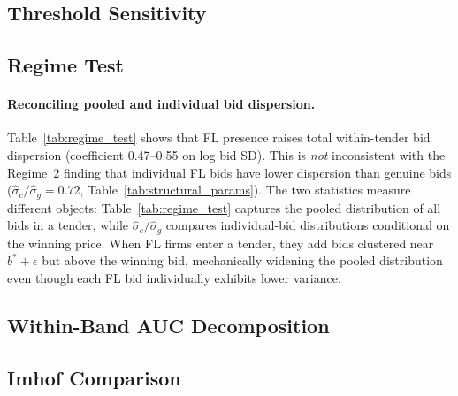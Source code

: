 

\subsection{Threshold Sensitivity}

\begin{table}[htbp]
\centering
\caption{Price Coefficient Across IQR Multiplier Thresholds}
\label{tab:threshold}

\end{table}

\subsection{Regime Test}



\paragraph{Reconciling pooled and individual bid dispersion.}
Table~\ref{tab:regime_test} shows that FL presence raises total within-tender bid dispersion (coefficient 0.47--0.55 on log bid SD). This is \emph{not} inconsistent with the Regime~2 finding that individual FL bids have lower dispersion than genuine bids ($\hat{\sigma}_c / \hat{\sigma}_g = 0.72$, Table~\ref{tab:structural_params}). The two statistics measure different objects: Table~\ref{tab:regime_test} captures the pooled distribution of all bids in a tender, while $\hat{\sigma}_c / \hat{\sigma}_g$ compares individual-bid distributions conditional on the winning price. When FL firms enter a tender, they add bids clustered near $b^* + \epsilon$ but above the winning bid, mechanically widening the pooled distribution even though each FL bid individually exhibits lower variance.

\subsection{Within-Band AUC Decomposition}



\subsection{Imhof Comparison}




